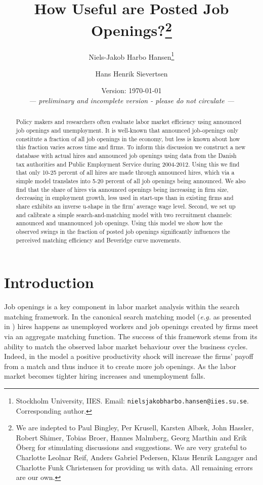 \documentclass[11pt,article]{memoir}
\title{How Useful are Posted Job Openings?\thanks{We are indepted to Paul Bingley, Per Krusell, Karsten Alb\ae k, John Hassler, Robert Shimer, Tobias Broer, Hannes Malmberg, Georg Marthin and Erik \"{O}berg for stimulating discussions and suggestions. We are very grateful to Charlotte Leolnar Reif, Anders Gabriel Pedersen, Klaus Henrik Langager and Charlotte Funk Christensen for providing us with data. All remaining errors are our own.}}
\author[1]{Niels-Jakob Harbo Hansen\thanks{Stockholm University, IIES.  Email: \texttt{nielsjakobharbo.hansen@iies.su.se}. Corresponding author. }}
\author[2]{Hans Henrik Sievertsen}
\affil[1]{Stockholm University, IIES}
\affil[2]{The Danish National Centre for Social Research (SFI)}
\date{Version: \today{}\\\emph{--- preliminary and incomplete version - please do not circulate ---}}
\begin{document}
\maketitle
\begin{abstract}
Policy makers and researchers often evaluate labor market efficiency using announced job openings and unemployment. It is well-known that announced job-openings  only constitute a fraction of all job openings in the economy, but less is known about how this fraction varies across time and firms. To inform this discussion we construct a new database with actual hires and announced job openings using data from the Danish tax authorities and Public Employment Service during 2004-2012. Using this we find that only 10-25 percent of all hires are made through announced hires, which via a simple model translates into 5-20 percent of all job openings being announced. We also find that the share of hires via announced openings being increasing in firm size, decreasing in employment growth, less used in start-ups than in existing firms and share exhibits an inverse u-shape in the firm' average wage level. Second, we set up and calibrate a simple search-and-matching model with two recruitment channels: announced and unannounced job openings. Using this model we show how the observed swings in the fraction of posted job openings significantly influences the perceived matching efficiency and Beveridge curve movements.
\end{abstract}  

\newpage

\section{Introduction}

Job openings is a key component in labor market analysis within the search matching framework. In the canonical search matching model (\emph{e.g.} as presented in \cite{Pissarides2000}) hires happens as unemployed workers and job openings created by firms meet via an aggregate matching function. The success of this framework stems from its ability to match the observed labor market behaviour over the business cycles. Indeed, in the model a positive productivity shock will increase the firms' payoff from a match and thus induce it to create more job openings. As the labor market becomes tighter hiring increases and unemployment falls. %
\end{document}
